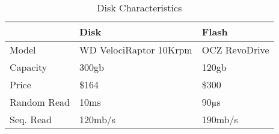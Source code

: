 \begin{table}
  \centering
  \begin{tabular}{ l l l }
  \toprule
   & Disk & Flash \\
   \midrule
   Model & WD VelociRaptor 10Krpm & OCZ RevoDrive \\
   Capacity & 300gb & 120gb \\
   Price & \$164 & \$300 \\
   Random Read & 10ms & 90$\muup$s \\
   Seq. Read & 120mb/s & 190mb/s \\
  \bottomrule
  \end{tabular}

  \caption{Disk Characteristics}
  \label{table:DiskCharacteristics}
\end{table}
